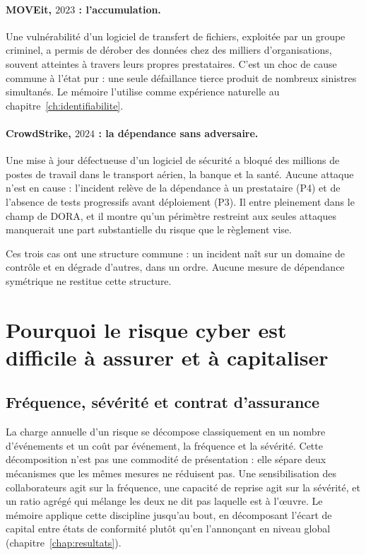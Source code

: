 \paragraph{MOVEit, $2023$ : l'accumulation.} Une vulnérabilité d'un logiciel de transfert de
fichiers, exploitée par un groupe criminel, a permis de dérober des données chez des milliers
d'organisations, souvent atteintes à travers leurs propres prestataires. C'est un choc de cause
commune à l'état pur : une seule défaillance tierce produit de nombreux sinistres simultanés. Le
mémoire l'utilise comme expérience naturelle au chapitre~\ref{ch:identifiabilite}.

\paragraph{CrowdStrike, $2024$ : la dépendance sans adversaire.} Une mise à jour défectueuse d'un
logiciel de sécurité a bloqué des millions de postes de travail dans le transport aérien, la
banque et la santé. Aucune attaque n'est en cause : l'incident relève de la dépendance à un
prestataire (P4) et de l'absence de tests progressifs avant déploiement (P3). Il entre pleinement
dans le champ de DORA, et il montre qu'un périmètre restreint aux seules attaques manquerait une
part substantielle du risque que le règlement vise.

\medskip
\noindent Ces trois cas ont une structure commune : un incident naît sur un domaine de contrôle
et en dégrade d'autres, dans un ordre. Aucune mesure de dépendance symétrique ne restitue cette
structure.

\section{Pourquoi le risque cyber est difficile à assurer et à capitaliser}
\label{sec:assurabilite-capital}

\subsection{Fréquence, sévérité et contrat d'assurance}
\label{subsec:frequence-severite-contrat}

La charge annuelle d'un risque se décompose classiquement en un nombre d'événements et un coût
par événement, la fréquence et la sévérité. Cette décomposition n'est pas une commodité de
présentation : elle sépare deux mécanismes que les mêmes mesures ne réduisent pas. Une
sensibilisation des collaborateurs agit sur la fréquence, une capacité de reprise agit sur la
sévérité, et un ratio agrégé qui mélange les deux ne dit pas laquelle est à l'\oe uvre. Le
mémoire applique cette discipline jusqu'au bout, en décomposant l'écart de capital entre états de
conformité plutôt qu'en l'annonçant en niveau global (chapitre~\ref{chap:resultats}).

